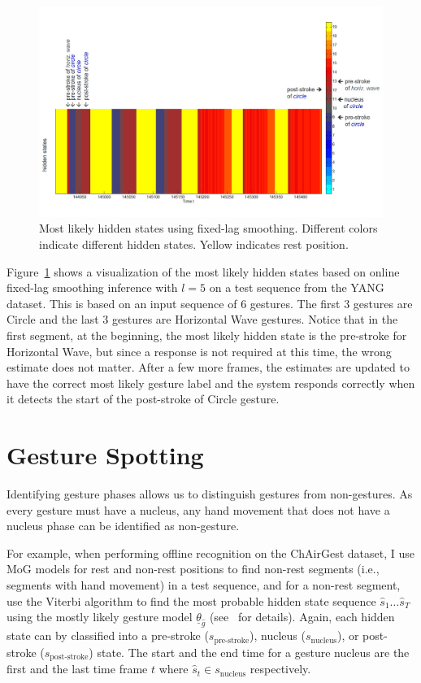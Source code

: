 \begin{figure}[t]
\centering
\includegraphics[trim=0 5mm 0
5mm, clip, width=\columnwidth]{figures/hidden_labeled.jpg}
\caption{Most likely hidden states using fixed-lag smoothing. Different colors indicate different hidden states. Yellow indicates rest position.}
\label{fig:visual_hidden}
\end{figure}

Figure~\ref{fig:visual_hidden} shows a visualization of the
most likely hidden states based on online fixed-lag smoothing inference
with $l = 5$ on a test sequence from the YANG dataset.
This is based on an input sequence of 6 gestures. The first 3 gestures are
Circle and the last 3 gestures are Horizontal Wave gestures. Notice that in
the first segment, at the beginning, the most likely hidden state is the
pre-stroke for Horizontal Wave, but since a response is not required at this
time, the wrong estimate does not matter. After a few more frames, the estimates are
updated to have the correct most likely gesture label and the system
responds correctly when it detects the start of the post-stroke of Circle
gesture.

\section{Gesture Spotting}
Identifying gesture phases allows us to distinguish gestures from non-gestures.
As every gesture must have a nucleus, any hand movement that does not have a
nucleus phase can be identified as non-gesture. 

For example, when performing offline recognition on the ChAirGest dataset, I use
MoG models for rest and non-rest positions to find non-rest segments (i.e.,
segments with hand movement) in a test sequence, and for a non-rest segment, use
the Viterbi algorithm to find the most probable hidden state sequence $\hat{s}_1\ldots\hat{s}_T$ using
the mostly likely gesture model $\underline{\theta}_{\hat{g}}$
(see~\cite{yin13} for details).
Again, each hidden state can by classified into a pre-stroke
($s_\text{pre-stroke}$), nucleus ($s_\text{nucleus}$), or post-stroke
($s_\text{post-stroke}$) state.
The start and the end time for a gesture nucleus are the first and the last time
frame $t$ where $\hat{s}_t\in s_{\text{nucleus}}$ respectively. 

